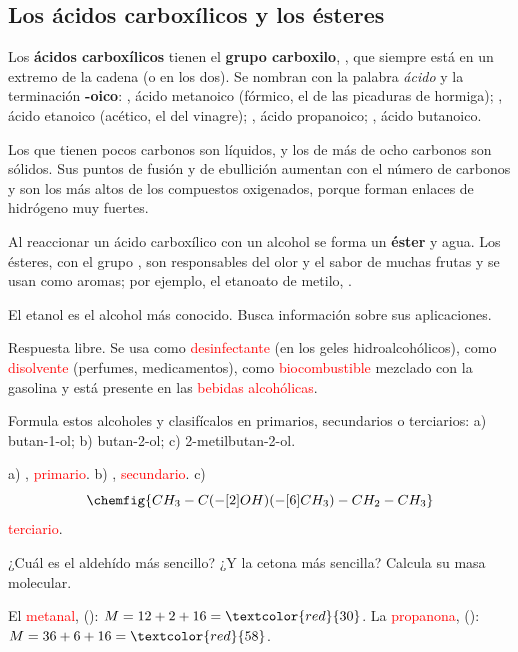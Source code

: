 \subsection{Los ácidos carboxílicos y los ésteres}

Los \textbf{ácidos carboxílicos} tienen el \textbf{grupo carboxilo}, , que siempre está en un extremo de la cadena (o en los dos). Se nombran con la palabra \emph{ácido} y la terminación \textbf{-oico}: , ácido metanoico (fórmico, el de las picaduras de hormiga); , ácido etanoico (acético, el del vinagre); , ácido propanoico; , ácido butanoico.

Los que tienen pocos carbonos son líquidos, y los de más de ocho carbonos son sólidos. Sus puntos de fusión y de ebullición aumentan con el número de carbonos y son los más altos de los compuestos oxigenados, porque forman enlaces de hidrógeno muy fuertes.

Al reaccionar un ácido carboxílico con un alcohol se forma un \textbf{éster} y agua. Los ésteres, con el grupo , son responsables del olor y el sabor de muchas frutas y se usan como aromas; por ejemplo, el etanoato de metilo, .

\begin{exercise}
    El etanol es el alcohol más conocido. Busca información sobre sus aplicaciones.
    \begin{solu}
        Respuesta libre. Se usa como \textcolor{red}{desinfectante} (en los geles hidroalcohólicos), como \textcolor{red}{disolvente} (perfumes, medicamentos), como \textcolor{red}{biocombustible} mezclado con la gasolina y está presente en las \textcolor{red}{bebidas alcohólicas}.
    \end{solu}
\end{exercise}

\begin{exercise}
    Formula estos alcoholes y clasifícalos en primarios, secundarios o terciarios: a) butan-1-ol; b) butan-2-ol; c) 2-metilbutan-2-ol.
    \begin{solu}
        a) , \textcolor{red}{primario}. b) , \textcolor{red}{secundario}.
        c) \[ \chemfig{CH_3-C(-[2]OH)(-[6]CH_3)-CH_2-CH_3} \] \textcolor{red}{terciario}.
    \end{solu}
\end{exercise}

\begin{exercise}
    ¿Cuál es el aldehído más sencillo? ¿Y la cetona más sencilla? Calcula su masa molecular.
    \begin{solu}
        El \textcolor{red}{metanal},  (): \(M = 12 + 2 + 16 = \textcolor{red}{30}\). La \textcolor{red}{propanona},  (): \(M = 36 + 6 + 16 = \textcolor{red}{58}\).
    \end{solu}
\end{exercise}


